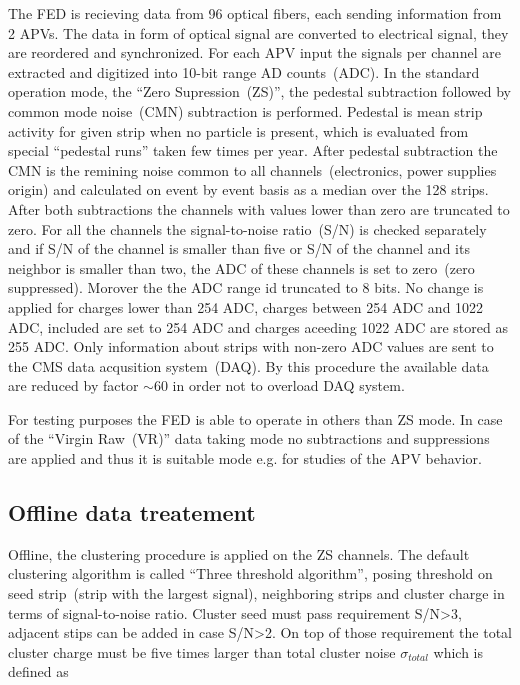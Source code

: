 The FED is recieving data from 96 optical fibers, each sending information from 2 APVs. The data in form of optical signal are converted to electrical signal, they are reordered and synchronized. For each APV input the signals per channel are extracted and digitized into 10-bit range AD counts~(ADC). In the standard operation mode, the ``Zero Supression~(ZS)'', the pedestal subtraction followed by common mode noise~(CMN) subtraction is performed. Pedestal is mean strip activity for given strip when no particle is present, which is evaluated from special ``pedestal runs'' taken few times per year. After pedestal subtraction the CMN is the remining noise common to all channels~(electronics, power supplies origin) and calculated on event by event basis as a median over the 128 strips. After both subtractions the channels with values lower than zero are truncated to zero. For all the channels the signal-to-noise ratio~(S/N) is checked separately and if S/N of the channel is smaller than five or S/N of the channel and its neighbor is smaller than two, the ADC of these channels is set to zero~(zero suppressed). Morover the the ADC range id truncated to 8 bits. No change is applied for charges lower than 254 ADC, charges between 254 ADC and 1022 ADC, included are set to 254 ADC and charges aceeding 1022 ADC are stored as 255 ADC. Only information about strips with non-zero ADC values are sent to the CMS data acqusition system~(DAQ). By this procedure the available data are reduced by factor $\sim$60 in order not to overload DAQ system.


For testing purposes the FED is able to operate in others than ZS mode. In case of the ``Virgin Raw~(VR)'' data taking mode no subtractions and suppressions are applied and thus it is suitable mode e.g. for studies of the APV behavior.

\subsection{Offline data treatement}

Offline, the clustering procedure is applied on the ZS channels. The default clustering algorithm is called ``Three threshold algorithm'', posing threshold on seed strip~(strip with the largest signal), neighboring strips and cluster charge in terms of signal-to-noise ratio. Cluster seed must pass requirement S/N>3, adjacent stips can be added in case S/N>2. On top of those requirement the total cluster charge must be five times larger than total cluster noise $\sigma_{total}$ which is defined as

